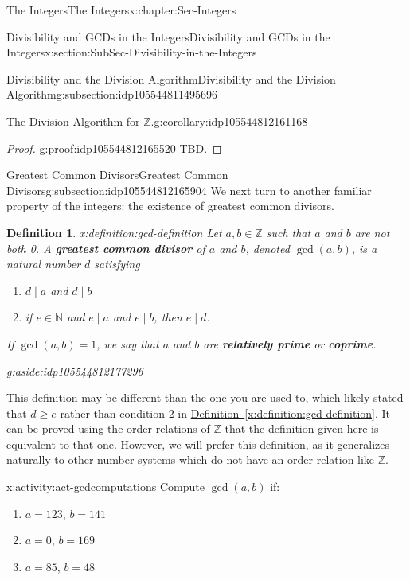 \documentclass[oneside,10pt,]{book}
\newcommand{\xreffont}{\relax}
\newcommand{\terminology}[1]{\textbf{#1}}
\numberwithin{equation}{section}
\renewcommand{\ge}{\geqslant}
\def\Z{{\mathbb Z}}
\def\N{{\mathbb N}}
\newtheorem{definition}[theorem]{Definition}
\begin{document}
\begin{chapterptx}{The Integers}{}{The Integers}{}{}{x:chapter:Sec-Integers}
\begin{sectionptx}{Divisibility and GCDs in the Integers}{}{Divisibility and GCDs in the Integers}{}{}{x:section:SubSec-Divisibility-in-the-Integers}
\begin{subsectionptx}{Divisibility and the Division Algorithm}{}{Divisibility and the Division Algorithm}{}{}{g:subsection:idp105544811495696}
\begin{corollary}{The Division Algorithm for \(\Z\).}{}{g:corollary:idp105544812161168}
\end{corollary}
\begin{proof}{}{g:proof:idp105544812165520}
TBD.%
\end{proof}
\end{subsectionptx}
%
%
\typeout{************************************************}
\typeout{************************************************}
%
\begin{subsectionptx}{Greatest Common Divisors}{}{Greatest Common Divisors}{}{}{g:subsection:idp105544812165904}
We next turn to another familiar property of the integers: the existence of greatest common divisors.%
\begin{definition}{}{x:definition:gcd-definition}%
\index{greatest common divisor (\(\Z\))}%
Let \(a,b\in \Z\) such that \(a\) and \(b\) are not both 0. A \terminology{greatest common divisor} of \(a\) and \(b\), denoted \(\gcd(a,b)\), is a natural number \(d\) satisfying%
\begin{enumerate}
\item{}\(d\mid a\) and \(d\mid b\)%
\item{}if \(e\in \N\) and \(e\mid a\) and \(e\mid b\), then \(e\mid d\).%
\end{enumerate}
%
\par
If \(\gcd(a,b) = 1\), we say that \(a\) and \(b\) are \terminology{relatively prime} or \terminology{coprime}. \begin{aside}{}{g:aside:idp105544812177296}%
\end{aside}
%
\end{definition}
%
This definition may be different than the one you are used to, which likely stated that \(d \ge e\) rather than condition 2 in \hyperref[x:definition:gcd-definition]{Definition~{\xreffont\ref{x:definition:gcd-definition}}}. It can be proved using the order relations of \(\Z\) that the definition given here is equivalent to that one. However, we will prefer this definition, as it generalizes naturally to other number systems which do not have an order relation like \(\Z\).%
\begin{activity}{}{x:activity:act-gcdcomputations}%
Compute \(\gcd(a,b)\) if:%
\begin{enumerate}
\item{}\(a = 123\), \(b = 141\)%
\item{}\(a = 0\), \(b = 169\)%
\item{}\(a= 85\), \(b = 48\)%

\end{enumerate}
\end{activity}
\end{subsectionptx}
\end{sectionptx}
\end{chapterptx}
\end{document}
